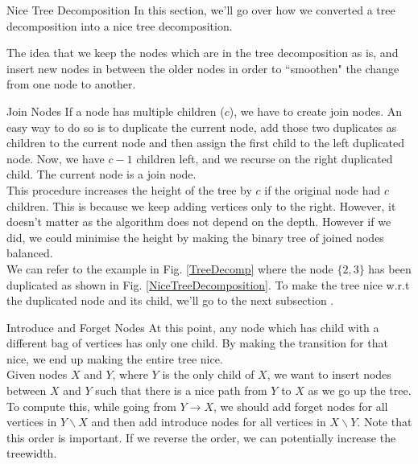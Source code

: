 \begin{section}{Nice Tree Decomposition}
	\label{section:NTD}
	In this section, we'll go over how we converted a tree decomposition into a nice tree decomposition. 
	
	
	
	The idea that we keep the nodes which are in the tree decomposition as is, and insert new nodes in between the older nodes in order to ``smoothen" the change from one node to another. 
	
	\begin{subsection}{Join Nodes}
			If a node has multiple children ($c$), we have to create join nodes. An easy way to do so is to duplicate the current node, add those two duplicates as children to the current node and then assign the first child to the left duplicated node. Now, we have $c-1$ children left, and we recurse on the right duplicated child. The current node is a join node. \\
			
			This procedure increases the height of the tree by $c$ if the original node had $c$ children. This is because we keep adding vertices only to the right. However, it doesn't matter as the algorithm does not depend on the depth. However if we did, we could minimise the height by making the binary tree of joined nodes balanced. \\
			
			We can refer to the example in Fig. \ref{TreeDecomp} where the node $\{2, 3\}$ has been duplicated as shown in Fig. \ref{NiceTreeDecomposition}. To make the tree nice w.r.t the duplicated node and its child, we'll go to the next subsection .
	\end{subsection}

	\begin{subsection}{Introduce and Forget Nodes}
		At this point, any node which has child with a different bag of vertices has only one child. By making the transition for that nice, we end up making the entire tree nice. \\
		
		Given nodes $X$ and $Y$, where $Y$ is the only child of $X$, we want to insert nodes between $X$ and $Y$ such that there is a nice path from $Y$ to $X$ as we go up the tree. \\
		
		To compute this, while going from $Y \rightarrow X$, we should add forget nodes for all vertices in $Y \backslash X$ and then add introduce nodes for all vertices in $X \backslash Y$. Note that this order is important. If we reverse the order, we can potentially increase the treewidth. \\ 
		

\end{subsection}
\end{section}
